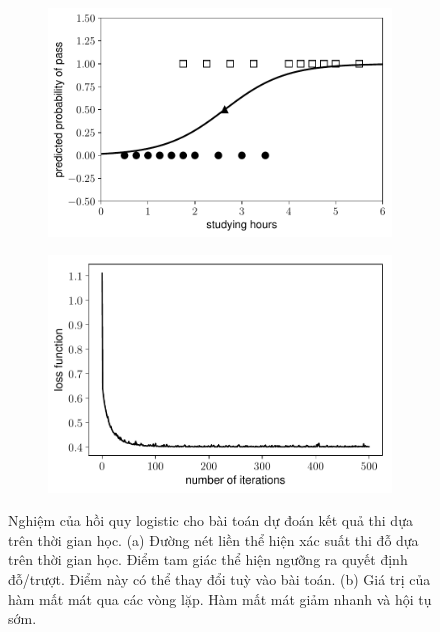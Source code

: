 \begin{figure}[t]
\begin{subfigure}{0.49\textwidth}
\includegraphics[width=0.99\linewidth]{ebookML_src/src/logistic_regression/log_reg_res.pdf}
\caption{}
\label{fig:10_resa}
\end{subfigure}
\begin{subfigure}{0.49\textwidth}
\includegraphics[width=0.99\linewidth]{ebookML_src/src/logistic_regression/log_reg_loss.pdf}
\caption{}
\label{fig:10_resb}
\end{subfigure}
\caption{
Nghiệm của hồi quy logistic cho bài toán dự đoán kết quả thi dựa trên
thời gian học. (a) Đường nét liền thể hiện xác suất thi đỗ dựa trên thời gian
học. Điểm tam giác thể hiện ngưỡng ra quyết định đỗ/trượt. Điểm này có
thể thay đổi tuỳ vào bài toán. (b) Giá trị của hàm mất mát qua các vòng lặp.
Hàm mất mát giảm nhanh và hội tụ sớm. }
\label{fig:10_res}
\end{figure}

